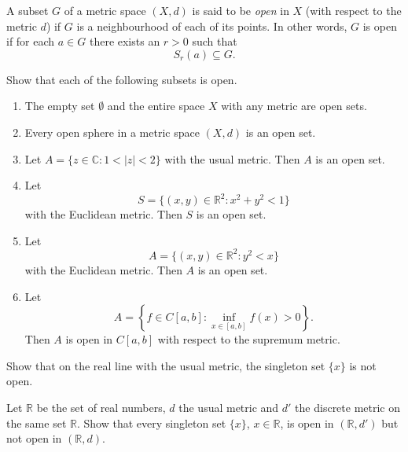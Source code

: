 \documentclass[12pt, a4paper]{article}
\begin{document}
\vspace{10pt}

\begin{definition}
A subset $G$ of a metric space $(X,d)$ is said to be \emph{open} in $X$ (with respect to the metric $d$)
if $G$ is a neighbourhood of each of its points. In other words, $G$ is open if for each $a\in G$
there exists an $r>0$ such that
\[
S_r(a)\subseteq G.
\]
\end{definition}

\clearpage

\begin{problem}
Show that each of the following subsets is open.

\begin{enumerate}
    \item The empty set $\emptyset$ and the entire space $X$ with any metric are open sets.

    \item Every open sphere in a metric space $(X,d)$ is an open set.

    \item Let $A=\{z\in\mathbb{C} : 1<|z|<2\}$ with the usual metric. Then $A$ is an open set.

    \item Let
    \[
    S=\{(x,y)\in\mathbb{R}^2 : x^2+y^2<1\}
    \]
    with the Euclidean metric. Then $S$ is an open set.

    \item Let
    \[
    A=\{(x,y)\in\mathbb{R}^2 : y^2<x\}
    \]
    with the Euclidean metric. Then $A$ is an open set.

    \item Let
    \[
    A=\left\{f\in C[a,b] : \inf_{x\in[a,b]} f(x)>0\right\}.
    \]
    Then $A$ is open in $C[a,b]$ with respect to the supremum metric.
\end{enumerate}
\end{problem}


\clearpage

\begin{problem}
Show that on the real line with the usual metric, the singleton set $\{x\}$ is not open.
\end{problem}

\vspace{250pt}

\begin{problem}
Let $\mathbb{R}$ be the set of real numbers, $d$ the usual metric and $d'$ the discrete metric on
the same set $\mathbb{R}$. Show that every singleton set $\{x\}$, $x\in\mathbb{R}$, is open in
$(\mathbb{R},d')$ but not open in $(\mathbb{R},d)$.
\end{problem}
\end{document}
